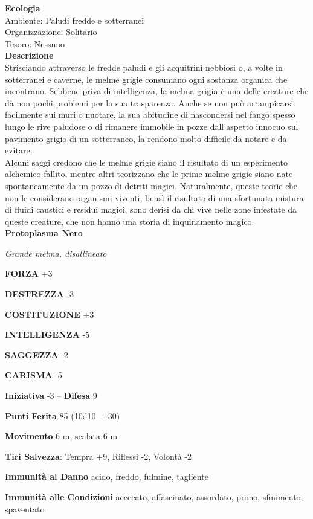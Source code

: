 \begin{multicols}{2}
\textbf{Ecologia}\\
Ambiente: Paludi fredde e sotterranei\\
Organizzazione: Solitario\\
Tesoro: Nessuno\\
\textbf{Descrizione}\\
Strisciando attraverso le fredde paludi e gli acquitrini nebbiosi o, a volte in sotterranei e caverne, le melme grigie consumano ogni sostanza organica che incontrano. Sebbene priva di intelligenza, la melma grigia è una delle creature che dà non pochi problemi per la sua trasparenza. Anche se non può arrampicarsi facilmente sui muri o nuotare, la sua abitudine di nascondersi nel fango spesso lungo le rive paludose o di rimanere immobile in pozze dall'aspetto innocuo sul pavimento grigio di un sotterraneo, la rendono molto difficile da notare e da evitare.\\

Alcuni saggi credono che le melme grigie siano il risultato di un esperimento alchemico fallito, mentre altri teorizzano che le prime melme grigie siano nate spontaneamente da un pozzo di detriti magici. Naturalmente, queste teorie che non le considerano organismi viventi, bensì il risultato di una sfortunata mistura di fluidi caustici e residui magici, sono derisi da chi vive nelle zone infestate da queste creature, che non hanno una storia di inquinamento magico.\\


\medskip{}\textbf{Protoplasma Nero}

\emph{Grande melma, disallineato}

\textbf{FORZA} +3

\textbf{DESTREZZA} -3

\textbf{COSTITUZIONE} +3

\textbf{INTELLIGENZA} -5

\textbf{SAGGEZZA} -2

\textbf{CARISMA} -5

\textbf{Iniziativa} -3 -- \textbf{Difesa} 9

\textbf{Punti Ferita} 85 (10d10 + 30)

\textbf{Movimento} 6 m, scalata 6 m

\textbf{Tiri Salvezza}: Tempra +9, Riflessi -2, Volontà -2

\textbf{Immunità al Danno} acido, freddo, fulmine, tagliente

\textbf{Immunità alle Condizioni} accecato, affascinato, assordato, prono, sfinimento, spaventato


\end{multicols}
